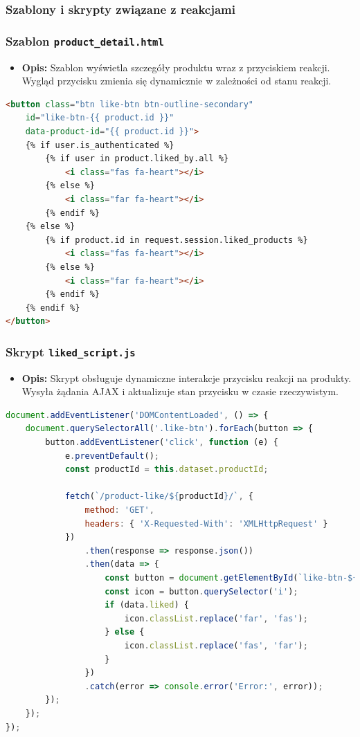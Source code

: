 \documentclass[12pt,a4paper,oneside]{article}
\theoremstyle{definition}
\numberwithin{equation}{section}
\begin{document}
\subsubsection{Szablony i skrypty związane z reakcjami}

\subsubsection*{Szablon \texttt{product\_detail.html}}
\begin{itemize}
    \item \textbf{Opis:}  
    Szablon wyświetla szczegóły produktu wraz z przyciskiem reakcji. Wygląd przycisku zmienia się dynamicznie w zależności od stanu reakcji.
\end{itemize}

\begin{lstlisting}[language=HTML, caption=Przycisk reakcji w szablonie]
<button class="btn like-btn btn-outline-secondary"
    id="like-btn-{{ product.id }}"
    data-product-id="{{ product.id }}">
    {% if user.is_authenticated %}
        {% if user in product.liked_by.all %}
            <i class="fas fa-heart"></i>
        {% else %}
            <i class="far fa-heart"></i>
        {% endif %}
    {% else %}
        {% if product.id in request.session.liked_products %}
            <i class="fas fa-heart"></i>
        {% else %}
            <i class="far fa-heart"></i>
        {% endif %}
    {% endif %}
</button>
\end{lstlisting}

\subsubsection*{Skrypt \texttt{liked\_script.js}}
\begin{itemize}
    \item \textbf{Opis:} 
    Skrypt obsługuje dynamiczne interakcje przycisku reakcji na produkty. Wysyła żądania AJAX i aktualizuje stan przycisku w czasie rzeczywistym.
\end{itemize}

\begin{lstlisting}[language=JavaScript, caption=Skrypt \texttt{liked\_script.js}]
document.addEventListener('DOMContentLoaded', () => {
    document.querySelectorAll('.like-btn').forEach(button => {
        button.addEventListener('click', function (e) {
            e.preventDefault();
            const productId = this.dataset.productId;

            fetch(`/product-like/${productId}/`, {
                method: 'GET',
                headers: { 'X-Requested-With': 'XMLHttpRequest' }
            })
                .then(response => response.json())
                .then(data => {
                    const button = document.getElementById(`like-btn-${productId}`);
                    const icon = button.querySelector('i');
                    if (data.liked) {
                        icon.classList.replace('far', 'fas');
                    } else {
                        icon.classList.replace('fas', 'far');
                    }
                })
                .catch(error => console.error('Error:', error));
        });
    });
});
\end{lstlisting}
\end{document}
